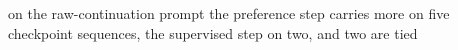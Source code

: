 on the raw-continuation prompt the preference step carries more on five checkpoint sequences, the supervised step on two, and two are tied
